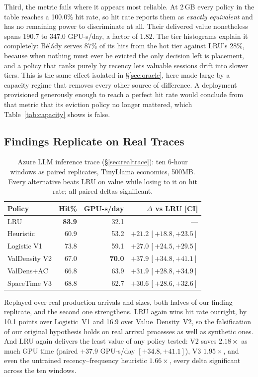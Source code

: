 \documentclass[letterpaper,twocolumn,10pt]{article}
\begin{document}
Third, the metric fails where it appears most reliable. At 2\,GB every policy in the table reaches a 100.0\% hit rate, so hit rate reports them as \emph{exactly equivalent} and has no remaining power to discriminate at all. Their delivered value nonetheless spans $190.7$ to $347.0$ GPU-s/day, a factor of $1.82$. The tier histograms explain it completely: B\'{e}l\'{a}dy serves 87\% of its hits from the hot tier against LRU's 28\%, because when nothing must ever be evicted the only decision left is placement, and a policy that ranks purely by recency lets valuable sessions drift into slower tiers. This is the same effect isolated in \S\ref{sec:oracle}, here made large by a capacity regime that removes every other source of difference. A deployment provisioned generously enough to reach a perfect hit rate would conclude from that metric that its eviction policy no longer mattered, which Table~\ref{tab:capacity} shows is false.

\subsection{Findings Replicate on Real Traces}
\label{sec:realtrace_results}

\begin{table}[t]
\centering
\caption{Azure LLM inference trace (\S\ref{sec:realtrace}): ten 6-hour windows as paired replicates, TinyLlama economics, 500MB. Every alternative beats LRU on value while losing to it on hit rate; all paired deltas significant.}
\label{tab:azure}
\small
\setlength{\tabcolsep}{2.5pt}
\begin{tabular}{@{}lrrr@{}}
\toprule
Policy & Hit\% & GPU-s/day & $\Delta$ vs LRU [CI] \\
\midrule
LRU              & \textbf{83.9} & 32.1 & --- \\
Heuristic        & 60.9 & 53.2 & $+21.2$\,$[+18.8,+23.5]$ \\
Logistic V1      & 73.8 & 59.1 & $+27.0$\,$[+24.5,+29.5]$ \\
ValDensity V2    & 67.0 & \textbf{70.0} & $+37.9$\,$[+34.8,+41.1]$ \\
ValDens+AC       & 66.8 & 63.9 & $+31.9$\,$[+28.8,+34.9]$ \\
SpaceTime V3     & 68.8 & 62.7 & $+30.6$\,$[+28.6,+32.6]$ \\
\bottomrule
\end{tabular}
\end{table}

Replayed over real production arrivals and sizes, both halves of our finding replicate, and the second one strengthens. LRU again wins hit rate outright, by 10.1 points over Logistic~V1 and 16.9 over Value~Density~V2, so the falsification of our original hypothesis holds on real arrival processes as well as synthetic ones. And LRU again delivers the least value of any policy tested: V2 saves $2.18\times$ as much GPU time (paired $+37.9$ GPU-s/day $[+34.8, +41.1]$), V3 $1.95\times$, and even the untrained recency--frequency heuristic $1.66\times$, every delta significant across the ten windows.
\end{document}
